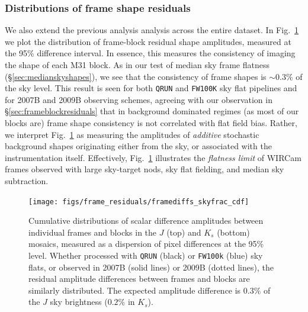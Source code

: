 \documentclass[iop]{emulateapj}
\newcommand{\mycomment}[1]{\textcolor{OliveGreen}{\textit{#1}}} %
\newcommand{\Fig}[1]{Fig.~\ref{fig:#1}}  %
\newcommand{\Sec}[1]{\S\ref{sec:#1}}  %
\begin{document}
\subsubsection{Distributions of frame shape residuals}
\label{sec:frameblockresidualhist}

We also extend the previous analysis analysis across the entire dataset.
In \Fig{frame_diffs_skyfrac} we plot the distribution of frame-block residual shape amplitudes, measured at the 95\% difference interval.
In essence, this measures the consistency of imaging the shape of each M31 block.
As in our test of median sky frame flatness (\Sec{medianskyshapes}), we see that the consistency of frame shapes is $\sim 0.3\%$ of the sky level.
This result is seen for both \texttt{QRUN} and \texttt{FW100K} sky flat pipelines and for 2007B and 2009B observing schemes, agreeing with our observation in \Sec{frameblockresiduals} that in background dominated regimes (as most of our blocks are) frame shape consistency is not correlated with flat field bias.
Rather, we interpret \Fig{frame_diffs_skyfrac} as measuring the amplitudes of \emph{additive} stochastic background shapes originating either from the sky, or associated with the instrumentation itself.
Effectively, \Fig{frame_diffs_skyfrac} illustrates the \emph{flatness limit} of WIRCam frames observed with large sky-target nods, sky flat fielding, and median sky subtraction.

\begin{figure}[t]
\centering
\texttt{[image: figs/frame\_residuals/framediffs\_skyfrac\_cdf]}
\caption{Cumulative distributions of scalar difference amplitudes between individual frames and blocks in the $J$ (top) and $K_s$ (bottom) mosaics, measured as a dispersion of pixel differences at the 95\% level.
Whether processed with \texttt{QRUN} (black) or \texttt{FW100k} (blue) sky flats, or observed in 2007B (solid lines) or 2009B (dotted lines), the residual amplitude differences between frames and blocks are similarly distributed.
The expected amplitude difference is $0.3\%$ of the $J$ sky brightness ($0.2\%$ in $K_s$).
}
\label{fig:frame_diffs_skyfrac}
\end{figure}

\end{document}

